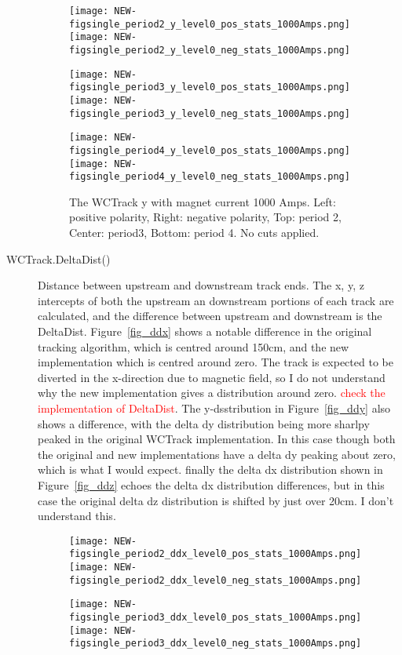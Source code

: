 \begin{description}
{      \begin{figure}[h]
        \centering   
         	\texttt{[image: NEW-figsingle\_period2\_y\_level0\_pos\_stats\_1000Amps.png]}
	 \texttt{[image: NEW-figsingle\_period2\_y\_level0\_neg\_stats\_1000Amps.png]}
	 
   	\texttt{[image: NEW-figsingle\_period3\_y\_level0\_pos\_stats\_1000Amps.png]}
	 \texttt{[image: NEW-figsingle\_period3\_y\_level0\_neg\_stats\_1000Amps.png]}
	 
 	\texttt{[image: NEW-figsingle\_period4\_y\_level0\_pos\_stats\_1000Amps.png]}
	 \texttt{[image: NEW-figsingle\_period4\_y\_level0\_neg\_stats\_1000Amps.png]}
   \caption[short]{The WCTrack y with magnet current 1000 Amps. Left: positive polarity, Right: negative polarity, Top: period 2, Center: period3,  Bottom: period 4. No cuts applied.}
   \label{fig_y}
  \end{figure}
  
  
 }


\item[WCTrack.DeltaDist()]{
Distance between upstream and downstream track ends. The x, y, z intercepts of both the upstream an downstream portions of each track are calculated, and the difference between upstream and downstream is the DeltaDist. Figure~\ref{fig_ddx}  shows a notable difference in the original tracking algorithm, which is centred around 150cm,  and the new implementation which is centred around zero. The track is expected to be diverted in the x-direction due to magnetic field, so I do not understand why the new implementation gives a distribution around zero. \textcolor{red}{check the implementation of DeltaDist}. The y-dsstribution in Figure~\ref{fig_ddy} also shows a difference, with the delta dy distribution being more sharlpy peaked in the original WCTrack implementation.  In this case though both the original and new implementations have a delta dy peaking about zero, which is what I would expect. finally the delta dx distribution shown in Figure~\ref{fig_ddz} echoes the delta dx distribution differences, but in this case the original delta dz distribution is shifted by just over 20cm. I don't understand this. 

 \begin{figure}[h]	 
   \centering   
    	\texttt{[image: NEW-figsingle\_period2\_ddx\_level0\_pos\_stats\_1000Amps.png]}
	 \texttt{[image: NEW-figsingle\_period2\_ddx\_level0\_neg\_stats\_1000Amps.png]}
	 
   	\texttt{[image: NEW-figsingle\_period3\_ddx\_level0\_pos\_stats\_1000Amps.png]}
	 \texttt{[image: NEW-figsingle\_period3\_ddx\_level0\_neg\_stats\_1000Amps.png]}
	 

\end{figure}}
\end{description}
